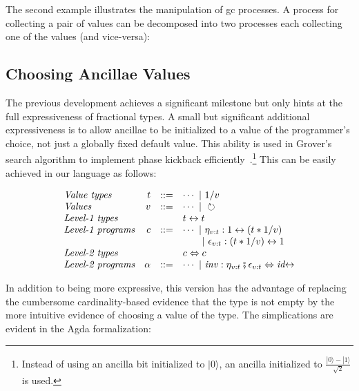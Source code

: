 \documentclass[sigplan,10pt,review,anonymous]{acmart}
\newcommand{\alt}{~|~}
\newcommand{\gcv}{\circlearrowright}
\newcommand{\ket}[1]{|#1\rangle}
\newcommand{\oneover}[1]{1/#1}
\newcommand{\idc}{\mathit{id}\!\!\leftrightarrow}
\begin{document}
\medskip
\begin{center}

\end{center}

\EtaEpsilonExampleone{}

The second example illustrates the manipulation of gc processes. A
process for collecting a pair of values can be decomposed into two
processes each collecting one of the values (and vice-versa):

\EtaEpsilonExampletwo{}

\subsection{Choosing Ancillae Values}
 
The previous development achieves a significant milestone but only
hints at the full expressiveness of fractional types. A small but
significant additional expressiveness is to allow ancillae to be
initialized to a value of the programmer's choice, not just a globally
fixed default value. This ability is used in Grover's search algorithm
to implement phase kickback
efficiently~\cite{howgrover}.\footnote{Instead of using an ancilla bit
  initialized to $\ket{0}$, an ancilla initialized to
  $\frac{\ket{0}-\ket{1}}{\sqrt{2}}$ is used.} This can be easily
achieved in our language as follows:

\[\begin{array}{lrcl}
\textit{Value types} & t &::=& \cdots \alt \oneover{v} \\
\textit{Values}      & v &::=& \cdots \alt \gcv \\
\textit{Level-1 types} &&& t \leftrightarrow t \\
\textit{Level-1 programs} & c &::=& \cdots \alt
   \eta_{v:t} : 1 \leftrightarrow (t * \oneover{v}) \\
   &&& ~~~~~\alt \epsilon_{v:t} : (t * \oneover{v}) \leftrightarrow 1 \\
\textit{Level-2 types} &&& c \Leftrightarrow c \\
\textit{Level-2 programs} & \alpha &::=& \cdots 
  \alt \mathit{inv} : \eta_{v:t} \fatsemi \epsilon_{v:t} \Leftrightarrow \idc 
\end{array}\]

In addition to being more expressive, this version has the advantage
of replacing the cumbersome cardinality-based evidence that the type
is not empty by the more intuitive evidence of choosing a value of the
type. The simplications are evident in the Agda formalization:
\end{document}

